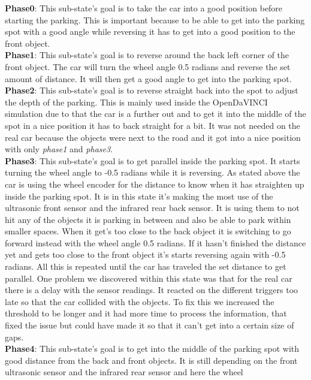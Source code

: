 \noindent
\textbf{Phase0}: This sub-state's goal is to take the car into a good position
before starting the parking. This is important because to be able to get into
the parking spot with a good angle while reversing it has to get into a good
position to the front object.\\
\textbf{Phase1}: This sub-state's goal is to reverse around the back left corner
of the front object. The car will turn the wheel angle 0.5 radians and reverse
the set amount of distance. It will then get a good angle to get into the
parking spot.\\
\textbf{Phase2}: This sub-state's goal is to reverse straight back into the spot
to adjust the depth of the parking. This is mainly used inside the OpenDaVINCI
simulation due to that the car is a further out and to get it into the middle of
the spot in a nice position it has to back straight for a bit. It was not needed
on the real car because the objects were next to the road and it got into a nice
position with only \textit{phase1} and \textit{phase3}.\\
\textbf{Phase3}: This sub-state's goal is to get parallel inside the parking
spot. It starts turning the wheel angle to -0.5 radians while it is reversing.
As stated above the car is using the wheel encoder for the distance to know when
it has straighten up inside the parking spot. It is in this state it's making
the most use of the ultrasonic front sensor and the infrared rear back sensor.
It is using them to not hit any of the objects it is parking in between and also
be able to park within smaller spaces. When it get’s too close to the back
object it is switching to go forward instead with the wheel angle 0.5 radians.
If it hasn't finished the distance yet and gets too close to the front object
it's starts reversing again with -0.5 radians. All this is repeated until the
car has traveled the set distance to get parallel. One problem we discovered
within this state was that for the real car there is a delay with the sensor
readings. It reacted on the different triggers too late so that the car collided
with the objects. To fix this we increased the threshold to be longer and it had
more time to process the information, that fixed the issue but could have made
it so that it can't get into a certain size of gaps.\\
\textbf{Phase4}: This sub-state's goal is to get into the middle of the parking
spot with good distance from the back and front objects. It is still depending
on the front ultrasonic sensor and the infrared rear sensor and here the wheel
